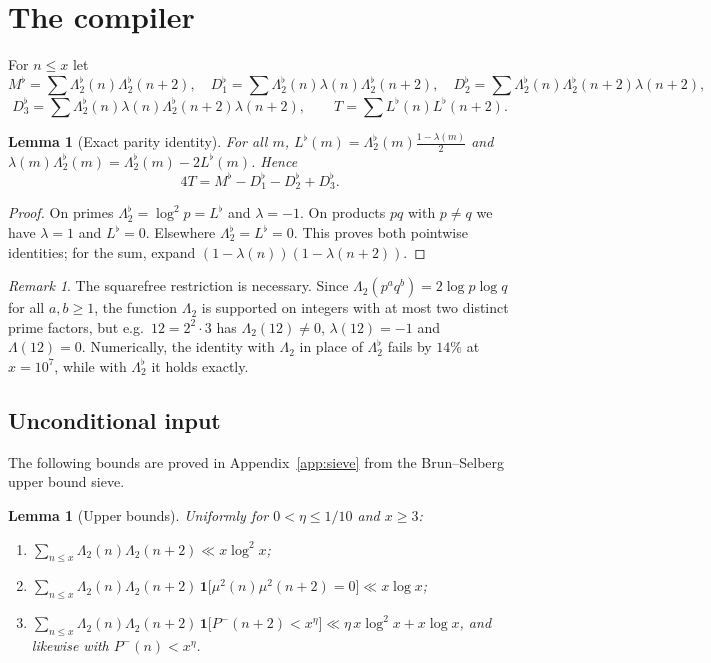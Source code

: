 \documentclass[11pt]{amsart}
\newtheorem{lemma}[theorem]{Lemma}
\theoremstyle{definition}
\theoremstyle{remark}
\newtheorem{remark}[theorem]{Remark}
\newcommand{\Lflat}{\Lambda_2^{\flat}}
\begin{document}
\section{The compiler}\label{sec:compiler}

For $n\le x$ let
\[
M^\flat=\sum\Lflat(n)\Lflat(n+2),\quad D_1^\flat=\sum\Lflat(n)\lambda(n)\Lflat(n+2),\quad D_2^\flat=\sum\Lflat(n)\Lflat(n+2)\lambda(n+2),
\]
\[
D_3^\flat=\sum\Lflat(n)\lambda(n)\Lflat(n+2)\lambda(n+2),\qquad T=\sum L^\flat(n)L^\flat(n+2).
\]

\begin{lemma}[Exact parity identity]\label{lem:parity}
For all $m$, $L^\flat(m)=\Lflat(m)\frac{1-\lambda(m)}{2}$ and $\lambda(m)\Lflat(m)=\Lflat(m)-2L^\flat(m)$. Hence
\[
4T=M^\flat-D_1^\flat-D_2^\flat+D_3^\flat .
\]
\end{lemma}
\begin{proof}
On primes $\Lflat=\log^2p=L^\flat$ and $\lambda=-1$. On products $pq$ with $p\ne q$ we have $\lambda=1$ and $L^\flat=0$. Elsewhere $\Lflat=L^\flat=0$. This proves both pointwise identities; for the sum, expand $(1-\lambda(n))(1-\lambda(n+2))$.
\end{proof}

\begin{remark}
The squarefree restriction is necessary. Since $\Lambda_2(p^aq^b)=2\log p\log q$ for all $a,b\ge1$, the function $\Lambda_2$ is supported on integers with at most two distinct prime factors, but e.g.\ $12=2^2\cdot3$ has $\Lambda_2(12)\ne0$, $\lambda(12)=-1$ and $\Lambda(12)=0$. Numerically, the identity with $\Lambda_2$ in place of $\Lflat$ fails by $14\%$ at $x=10^7$, while with $\Lflat$ it holds exactly.
\end{remark}

\subsection{Unconditional input}
The following bounds are proved in Appendix~\ref{app:sieve} from the Brun--Selberg upper bound sieve.

\begin{lemma}[Upper bounds]\label{lem:upper}
Uniformly for $0<\eta\le1/10$ and $x\ge3$:
\begin{enumerate}
\item[(a)] $\displaystyle\sum_{n\le x}\Lambda_2(n)\Lambda_2(n+2)\ll x\log^2x$;
\item[(b)] $\displaystyle\sum_{n\le x}\Lambda_2(n)\Lambda_2(n+2)\,\mathbf 1\bigl[\mu^2(n)\mu^2(n+2)=0\bigr]\ll x\log x$;
\item[(c)] $\displaystyle\sum_{n\le x}\Lambda_2(n)\Lambda_2(n+2)\,\mathbf 1\bigl[P^-(n+2)<x^\eta\bigr]\ll\eta\,x\log^2x+x\log x$, and likewise with $P^-(n)<x^\eta$.
\end{enumerate}
\end{lemma}
\end{document}
